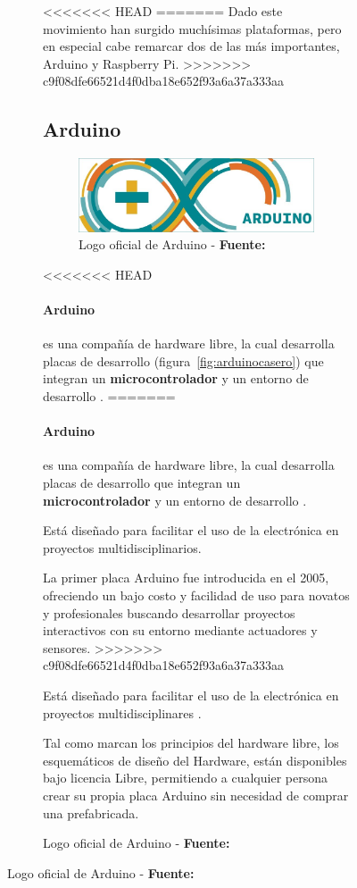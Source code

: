 \begin{itemize}
\begin{itemize}
\begin{figure}[h]
\begin{figure}[h]
<<<<<<< HEAD
=======
Dado este movimiento han surgido muchísimas plataformas, pero en especial cabe remarcar dos de las más importantes, Arduino y Raspberry Pi.
>>>>>>> c9f08dfe66521d4f0dba18e652f93a6a37a333aa

\subsection{Arduino}


\begin{figure}
\centering
\includegraphics[width=0.75\linewidth]{../images/arduino}
\caption[Arduino]{Logo oficial de Arduino - \textbf{Fuente:} \cite{ARDUINO}}
\label{fig:arduino}
\end{figure}


<<<<<<< HEAD
\paragraph{Arduino} es una compañía de hardware libre, la cual desarrolla placas de desarrollo (figura~\ref{fig:arduinocasero}) que integran un \textbf{microcontrolador} y un entorno de desarrollo \cite{IDE}.
=======
\bigskip
\paragraph{Arduino} es una compañía de hardware libre, la cual desarrolla placas de desarrollo que integran un \textbf{microcontrolador} y un entorno de desarrollo  \cite{IDE}.

\bigskip
Está diseñado para facilitar el uso de la electrónica en proyectos multidisciplinarios\cite{ARDUINO}.

\bigskip
La primer placa Arduino fue introducida en el 2005, ofreciendo un bajo costo y facilidad de uso para novatos y profesionales buscando desarrollar proyectos interactivos con su entorno mediante actuadores y sensores.
>>>>>>> c9f08dfe66521d4f0dba18e652f93a6a37a333aa

Está diseñado para facilitar el uso de la electrónica en proyectos multidisciplinares \cite{ARDUINO}.

Tal como marcan los principios del hardware libre, los esquemáticos de diseño del Hardware, están disponibles bajo licencia Libre, permitiendo a cualquier persona crear su propia placa Arduino sin necesidad de comprar una prefabricada. 



\end{figure}
\end{figure}
\end{itemize}
\end{itemize}
